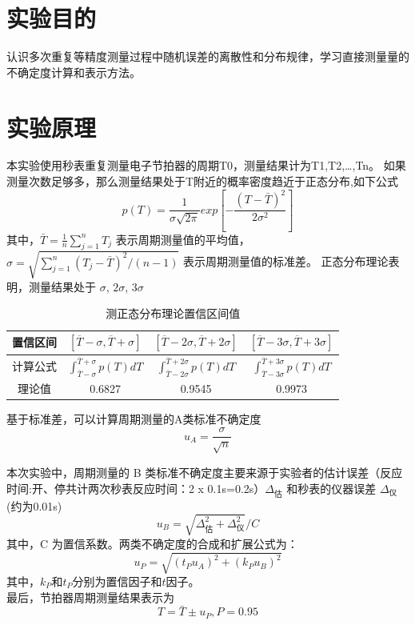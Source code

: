 \documentclass[12pt,a4paper]{article}
\begin{document}
	\section{实验目的}
	认识多次重复等精度测量过程中随机误差的离散性和分布规律，学习直接测量量的不确定度计算和表示方法。

	\section{实验原理}
	本实验使用秒表重复测量电子节拍器的周期T0，测量结果计为T1,T2,\dots,Tn。
	如果测量次数足够多，那么测量结果处于T附近的概率密度趋近于正态分布,如下公式
	$$p(T)=\frac{1}{\sigma\sqrt{2\pi}}exp[-\frac{(T-\bar{T})^2}{2\sigma^2}]$$
	其中，$\bar{T}=\frac{1}{n}\sum_{j=1}^{n}T_j$ 表示周期测量值的平均值，$\sigma=\sqrt{\sum_{j=1}^{n}(T_j-\bar{T})^2/(n-1)}$ 表示周期测量值的标准差。
	正态分布理论表明，测量结果处于 $\sigma$, $2\sigma$, $3\sigma$ 

	\begin{table}[h]
		\centering %
		\renewcommand{\arraystretch}{2.0} %
		\begin{tabular}{|c|c|c|c|}
			\hline
			置信区间 & $[\overline{T}-\sigma,\overline{T}+\sigma]$ & $[\overline{T}-2\sigma,\overline{T}+2\sigma]$ & $[\overline{T}-3\sigma,\overline{T}+3\sigma]$ \\ \hline
			计算公式 & $\int_{\bar{T}-\sigma}^{\bar{T}+\sigma} p(T) dT$ & $\int_{\bar{T}-2\sigma}^{\bar{T}+2\sigma} p(T) dT $ & $\int_{\bar{T}-3\sigma}^{\bar{T}+3\sigma} p(T) dT $ \\ \hline
			理论值 & 0.6827 & 0.9545 & 0.9973 \\ \hline
		\end{tabular}
		\caption{测正态分布理论置信区间值} %
		\label{tab:confidence_intervals} %
	\end{table}
	
	基于标准差，可以计算周期测量的A类标准不确定度
	$$u_A=\frac{\sigma}{\sqrt{n}}$$
	
	本次实验中，周期测量的 B 类标准不确定度主要来源于实验者的估计误差（反应时间:开、停共计两次秒表反应时间：2 x 0.1s=0.2s）$\Delta_{\text{估}}$ 和秒表的仪器误差 $\Delta_{\text{仪}}$(约为0.01s)
	\[u_B=\sqrt{\Delta_{\text{估}}^2+\Delta_{\text{仪}}^2}/C\]
	其中，C 为置信系数。两类不确定度的合成和扩展公式为：\[u_P=\sqrt{(t_Pu_A)^2+(k_Pu_B)^2}\]
	其中，$k_{P}$和$t_{P}$分别为置信因子和$t$因子。 
	\\最后，节拍器周期测量结果表示为\[T=\bar{T}\pm u_P,P=0.95\]
	
\end{document}
